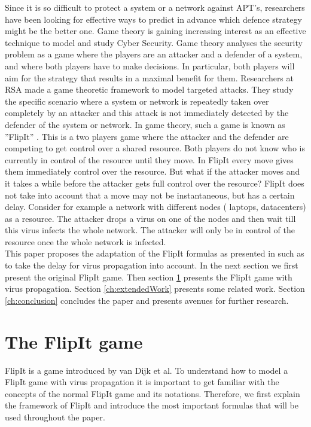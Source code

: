 \documentclass[journal,a4paper]{IEEEtran}
\begin{document}
Since it is so difficult to protect a system or a network against APT's, researchers have been looking for effective ways to predict in advance which defence strategy might be the better one. 
Game theory is gaining increasing interest as an effective technique to model and study Cyber Security. Game theory analyses the security problem as a game where the players are an attacker and a defender of a system, and where both players have to make decisions. In particular, both players will aim for the strategy that results in a maximal benefit for them.  Researchers at RSA made a game theoretic framework to model targeted attacks. They study the specific scenario where a system or network is repeatedly taken over completely by an attacker and this attack is not immediately detected by the defender of the system or network. In game theory, such a game is known as ''FlipIt'' \cite{FlipIt}. This is a two players game where the attacker and the defender are competing to get control over a shared resource. Both players do not know who is currently in control of the resource until they move. In FlipIt every move gives them immediately control over the resource. But what if the attacker moves and it takes a while before the attacker gets full control over the resource? FlipIt does not take into account that a move may not be instantaneous, but has a certain delay. Consider for example a network with different nodes ( laptops, datacenters) as a resource. The attacker drops a virus on one of the nodes and then wait till this virus infects the whole network. The attacker will only be in control of the resource once the whole network is infected. \\

This paper proposes the adaptation of the FlipIt formulas as presented in \cite{FlipIt} such as to take the delay for virus propagation into account. In the next section we first present the original FlipIt game. Then section \ref{ch:FlipItGame} presents the FlipIt game with virus propagation. Section \ref{ch:extendedWork} presents some related work. Section \ref{ch:conclusion} concludes the paper and presents avenues for further research.

\section{The FlipIt game}
\label{ch:FlipItGame}
FlipIt is a game introduced by van Dijk et al. To understand how to model a FlipIt game with virus propagation it is important to get familiar with the concepts of the normal FlipIt game and its notations.  Therefore, we first explain the framework of FlipIt and introduce the most important formulas that will be used throughout the paper. \\
\end{document}
